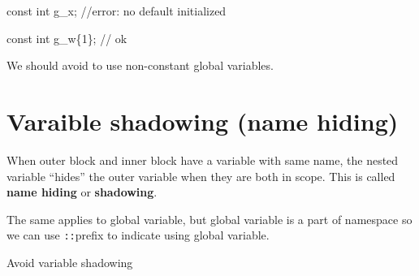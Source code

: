 \documentclass[
  letterpaper,
  DIV=11,
  numbers=noendperiod]{scrreprt}
\newenvironment{Shaded}{\begin{snugshade}}{\end{snugshade}}
\newcommand{\DecValTok}[1]{\textcolor[rgb]{0.68,0.00,0.00}{#1}}
\newcommand{\ErrorTok}[1]{\textcolor[rgb]{0.68,0.00,0.00}{#1}}
\newcommand{\NormalTok}[1]{\textcolor[rgb]{0.00,0.23,0.31}{#1}}
\newcommand{\SpecialCharTok}[1]{\textcolor[rgb]{0.37,0.37,0.37}{#1}}
\begin{document}
\begin{Shaded}
\begin{Highlighting}[]
\NormalTok{const int g\_x;  }\SpecialCharTok{/}\ErrorTok{/}\NormalTok{error}\SpecialCharTok{:}\NormalTok{ no default initialized}

\NormalTok{const int g\_w\{}\DecValTok{1}\NormalTok{\}; }\SpecialCharTok{/}\ErrorTok{/}\NormalTok{ ok}
\end{Highlighting}
\end{Shaded}

\begin{tcolorbox}[enhanced jigsaw, toprule=.15mm, rightrule=.15mm, opacityback=0, breakable, leftrule=.75mm, colback=white, colframe=quarto-callout-warning-color-frame, arc=.35mm, left=2mm, bottomrule=.15mm]
\begin{minipage}[t]{5.5mm}
\textcolor{quarto-callout-warning-color}{\faExclamationTriangle}
\end{minipage}%
\begin{minipage}[t]{\textwidth - 5.5mm}

We should avoid to use non-constant global variables.

\end{minipage}%
\end{tcolorbox}

\hypertarget{varaible-shadowing-name-hiding}{%
\section{Varaible shadowing (name
hiding)}\label{varaible-shadowing-name-hiding}}

When outer block and inner block have a variable with same name, the
nested variable ``hides'' the outer variable when they are both in
scope. This is called \textbf{name hiding} or \textbf{shadowing}.

The same applies to global variable, but global variable is a part of
namespace so we can use \texttt{::}prefix to indicate using global
variable.

\begin{tcolorbox}[enhanced jigsaw, toprule=.15mm, rightrule=.15mm, opacityback=0, breakable, leftrule=.75mm, colback=white, colframe=quarto-callout-tip-color-frame, arc=.35mm, left=2mm, bottomrule=.15mm]
\begin{minipage}[t]{5.5mm}
\textcolor{quarto-callout-tip-color}{\faLightbulb}
\end{minipage}%
\begin{minipage}[t]{\textwidth - 5.5mm}

Avoid variable shadowing

\end{minipage}%
\end{tcolorbox}
\end{document}

